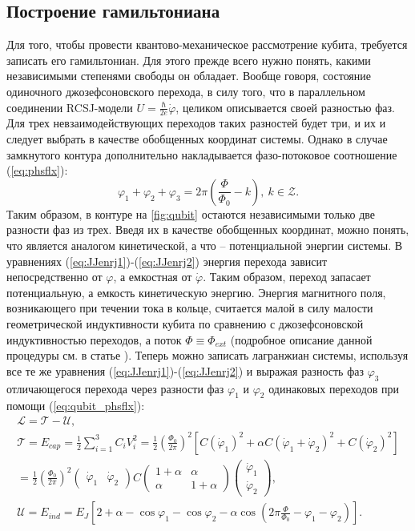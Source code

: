\documentclass[12pt, twoside]{report}
\numberwithin{equation}{section}
\numberwithin{figure}{section}
\begin{document}
\subsection{Построение гамильтониана}
Для того, чтобы провести квантово-механическое рассмотрение кубита, требуется записать его гамильтониан. Для этого прежде всего нужно понять, какими независимыми степенями свободы он обладает. Вообще говоря, состояние одиночного джозефсоновского перехода, в силу того, что в параллельном соединении RCSJ-модели $U = \frac{\hbar}{2e}\dot\varphi$, целиком описывается своей разностью фаз. Для трех невзаимодействующих переходов таких разностей будет три, и их и следует выбрать в качестве обобщенных координат системы. Однако в случае замкнутого контура дополнительно накладывается фазо-потоковое соотношение (\ref{eq:phsflx}):
\begin{equation}
\varphi_1 + \varphi_2 + \varphi_3 = 2\pi\left(\frac{\Phi}{\Phi_0} - k\right),\ k\in \mathcal{Z}.
\label{eq:qubit_phsflx}
\end{equation}
Таким образом, в контуре на \autoref{fig:qubit} остаются независимыми только две разности фаз из трех. Введя их в качестве обобщенных координат, можно понять, что является аналогом кинетической, а что -- потенциальной энергии системы. В уравнениях (\ref{eq:JJenrj1})-(\ref{eq:JJenrj2}) энергия перехода зависит непосредственно от $\varphi$, а емкостная от $\dot \varphi$. Таким образом, переход запасает потенциальную, а емкость кинетическую энергию. Энергия магнитного поля, возникающего при течении тока в кольце, считается малой в силу малости геометрической индуктивности кубита по сравнению с джозефсоновской индуктивностью переходов, а поток $\Phi \equiv \Phi_{ext}$ (подробное описание данной процедуры см. в статье \cite{Robertson2006}). Теперь можно записать лагранжиан системы, используя все те же уравнения (\ref{eq:JJenrj1})-(\ref{eq:JJenrj2}) и выражая разность фаз $\varphi_3$ отличающегося перехода через разности фаз $\varphi_1$ и $\varphi_2$ одинаковых переходов при помощи (\ref{eq:qubit_phsflx}):
\begin{gather*}
\mathcal{L} = \mathcal{T}-\mathcal{U}, \\
\mathcal{T} = E_{cap} =\frac{1}{2}\sum_{i=1}^3 C_i V_i^2 = \frac{1}{2} \left(\frac{\Phi_0}{2\pi}\right)^2 \left[C(\dot \varphi_1)^2 + \alpha C \left(\dot \varphi_1 + \dot\varphi_2\right)^2 + C(\dot \varphi_2)^2\right] \\
= \frac{1}{2}\left(\frac{\Phi_0}{2\pi}\right)^2 \left(\begin{matrix}
\dot\varphi_1 &\dot\varphi_2
\end{matrix}\right) C \left(\begin{matrix}
1+\alpha & \alpha \\
\alpha & 1+\alpha
\end{matrix}
\right)
\left(\begin{matrix}
\dot\varphi_1 \\
\dot\varphi_2
\end{matrix}\right),\\
\mathcal{U} = E_{ind} = E_J\left[2+\alpha - \cos\varphi_1 - \cos\varphi_2 - \alpha \cos\left(2\pi\frac{\Phi}{\Phi_0} - \varphi_1 - \varphi_2 \right)\right].
\end{gather*}
\end{document}
